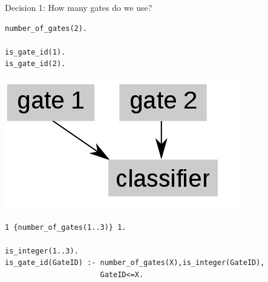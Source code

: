 \documentclass[10pt,dvipsnames]{beamer}
\begin{document}
\begin{frame}[fragile]{Decision 1: How many gates do we use?}

\small
\begin{minipage}{0.45\textwidth}
\color{my_example_color}
\begin{verbatim}
number_of_gates(2).

is_gate_id(1).
is_gate_id(2).
\end{verbatim}

\end{minipage}
\hfill
\begin{minipage}{0.45\textwidth}
\begin{center}
\includegraphics[scale=0.3]{exp1.png}
\end{center}
\end{minipage}
\vspace{1.3cm}

\begin{verbatim}
1 {number_of_gates(1..3)} 1.

is_integer(1..3).
is_gate_id(GateID) :- number_of_gates(X),is_integer(GateID), 
                      GateID<=X.
\end{verbatim}
\end{frame}
\end{document}
